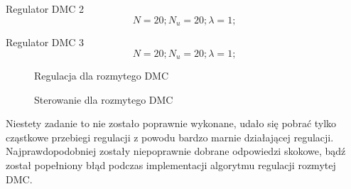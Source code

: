 Regulator DMC 2
\begin{equation}
N = 20; 
N_u = 20; 
\lambda = 1; 
\end{equation}

Regulator DMC 3
\begin{equation}
N = 20; 
N_u = 20; 
\lambda =1; 
\end{equation}

\begin{figure}[H]
\centering

\caption{Regulacja dla rozmytego DMC}
\end{figure}

\begin{figure}[H]
\centering

\caption{Sterowanie dla rozmytego DMC}
\end{figure}


 Niestety zadanie to nie zostało poprawnie wykonane, udało się pobrać tylko cząstkowe przebiegi regulacji z powodu bardzo marnie działającej regulacji. Najprawdopodobniej zostały niepoprawnie dobrane odpowiedzi skokowe, bądź został popełniony błąd podczas implementacji algorytmu regulacji rozmytej DMC.